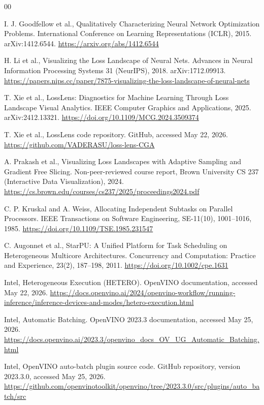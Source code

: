 \documentclass[conference]{IEEEtran}
\begin{document}
\begin{thebibliography}{00}

I. J. Goodfellow et al., Qualitatively
Characterizing Neural Network Optimization Problems.
International Conference on Learning Representations (ICLR),
2015. arXiv:1412.6544.
\url{https://arxiv.org/abs/1412.6544}

H. Li et al., Visualizing the Loss Landscape of Neural Nets. Advances in
Neural Information Processing Systems 31 (NeurIPS), 2018.
arXiv:1712.09913.
\url{https://papers.nips.cc/paper/7875-visualizing-the-loss-landscape-of-neural-nets}

T. Xie et al., LossLens: Diagnostics for Machine Learning Through
Loss Landscape Visual Analytics. IEEE Computer Graphics and Applications, 2025.
arXiv:2412.13321.
\url{https://doi.org/10.1109/MCG.2024.3509374}

T. Xie et al., LossLens code repository. GitHub, accessed May 22, 2026.
\url{https://github.com/VADERASU/loss-lens-CGA}

A. Prakash et al., Visualizing Loss Landscapes with Adaptive
Sampling and Gradient Free Slicing. Non-peer-reviewed course
report, Brown University CS 237 (Interactive Data Visualization),
2024.
\url{https://cs.brown.edu/courses/cs237/2025/proceedings2024.pdf}

C. P. Kruskal and A. Weiss, Allocating Independent Subtasks
on Parallel Processors. IEEE Transactions on Software
Engineering, SE-11(10), 1001--1016, 1985.
\url{https://doi.org/10.1109/TSE.1985.231547}

C. Augonnet et al., StarPU: A Unified Platform for Task Scheduling
on Heterogeneous Multicore Architectures. Concurrency and Computation: Practice and
Experience, 23(2), 187--198, 2011.
\url{https://doi.org/10.1002/cpe.1631}

Intel, Heterogeneous Execution (HETERO). OpenVINO documentation,
accessed May 22, 2026.
\url{https://docs.openvino.ai/2024/openvino-workflow/running-inference/inference-devices-and-modes/hetero-execution.html}

Intel, Automatic Batching. OpenVINO 2023.3 documentation,
accessed May 25, 2026.
\url{https://docs.openvino.ai/2023.3/openvino_docs_OV_UG_Automatic_Batching.html}

Intel, OpenVINO auto-batch plugin source code. GitHub repository,
version 2023.3.0, accessed May 25, 2026.
\url{https://github.com/openvinotoolkit/openvino/tree/2023.3.0/src/plugins/auto_batch/src}


\end{thebibliography}
\end{document}
